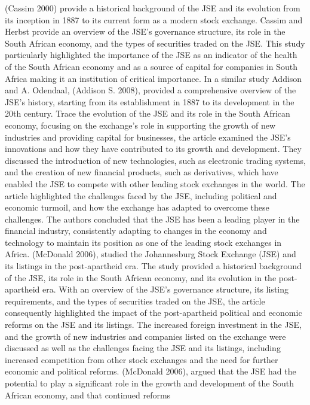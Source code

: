 \documentclass[
]{article}
\begin{document}
(Cassim 2000) provide a historical background of the JSE and its
evolution from its inception in 1887 to its current form as a modern
stock exchange. Cassim and Herbst provide an overview of the JSE's
governance structure, its role in the South African economy, and the
types of securities traded on the JSE. This study particularly
highlighted the importance of the JSE as an indicator of the health of
the South African economy and as a source of capital for companies in
South Africa making it an institution of critical importance. In a
similar study Addison and A. Odendaal, (Addison S. 2008), provided a
comprehensive overview of the JSE's history, starting from its
establishment in 1887 to its development in the 20th century. Trace the
evolution of the JSE and its role in the South African economy, focusing
on the exchange's role in supporting the growth of new industries and
providing capital for businesses, the article examined the JSE's
innovations and how they have contributed to its growth and development.
They discussed the introduction of new technologies, such as electronic
trading systems, and the creation of new financial products, such as
derivatives, which have enabled the JSE to compete with other leading
stock exchanges in the world. The article highlighted the challenges
faced by the JSE, including political and economic turmoil, and how the
exchange has adapted to overcome these challenges. The authors concluded
that the JSE has been a leading player in the financial industry,
consistently adapting to changes in the economy and technology to
maintain its position as one of the leading stock exchanges in Africa.
(McDonald 2006), studied the Johannesburg Stock Exchange (JSE) and its
listings in the post-apartheid era. The study provided a historical
background of the JSE, its role in the South African economy, and its
evolution in the post-apartheid era. With an overview of the JSE's
governance structure, its listing requirements, and the types of
securities traded on the JSE, the article consequently highlighted the
impact of the post-apartheid political and economic reforms on the JSE
and its listings. The increased foreign investment in the JSE, and the
growth of new industries and companies listed on the exchange were
discussed as well as the challenges facing the JSE and its listings,
including increased competition from other stock exchanges and the need
for further economic and political reforms. (McDonald 2006), argued that
the JSE had the potential to play a significant role in the growth and
development of the South African economy, and that continued reforms
\end{document}
